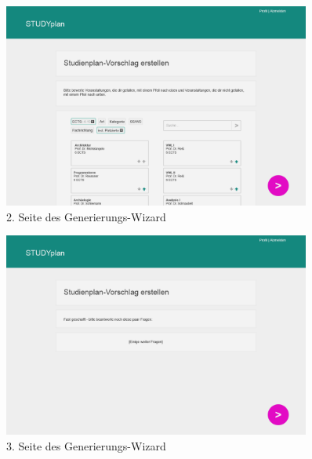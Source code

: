 \begin{figure}
	\caption{2. Seite des Generierungs-Wizard}
	\label{fig:gui-generierung-2}
	\centering
	\includegraphics[width=0.9\textwidth]{../GUI/ergebnisse/generierung-2.png}
\end{figure}

\begin{figure}
	\caption{3. Seite des Generierungs-Wizard}
	\label{fig:gui-generierung-3}
	\centering
	\includegraphics[width=0.9\textwidth]{../GUI/ergebnisse/generierung-3.png}
\end{figure}

